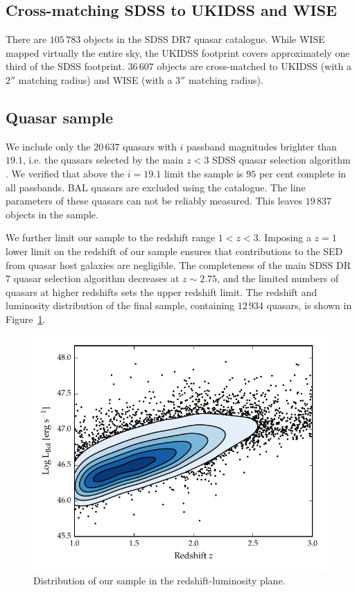 \subsection{Cross-matching SDSS to UKIDSS and WISE}

There are $105\,783$ objects in the SDSS DR$7$ quasar catalogue.
While WISE mapped virtually the entire sky, the UKIDSS footprint covers approximately one third of the SDSS footprint.
$36\,607$ objects are cross-matched to UKIDSS (with a $2''$ matching radius) and WISE (with a $3$$''$ matching radius).

\subsection{Quasar sample}

We include only the $20\,637$ quasars with $i$ passband magnitudes brighter than $19.1$, i.e. the quasars selected by the main $z<3$ SDSS quasar selection algorithm \citep{richards02}.
We verified that above the $i=19.1$ limit the sample is $95$ per cent complete in all passbands.
BAL quasars are excluded using the \citet{allen11} catalogue.
The  line parameters of these quasars can not be reliably measured.
This leaves $19\,837$  objects in the sample.

We further limit our sample to the redshift range $1 < z < 3$.
Imposing a $z=1$ lower limit on the redshift of our sample ensures that contributions to the SED from quasar host galaxies are negligible.
The completeness of the main SDSS DR$7$ quasar selection algorithm decreases at $z\sim2.75$, and the limited numbers of quasars at higher redshifts sets the upper redshift limit.
The redshift and luminosity distribution of the final sample, containing $12\,934$ quasars, is shown in Figure~\ref{fig:lum_z}.

\begin{figure}
  \centering
  \includegraphics[width=\textwidth]{figures/chapter05/lum_z.pdf}
  \caption[{Distribution of our sample in the redshift-luminosity plane.}]{Distribution of our sample in the redshift-luminosity plane.}
  \label{fig:lum_z}
\end{figure}

